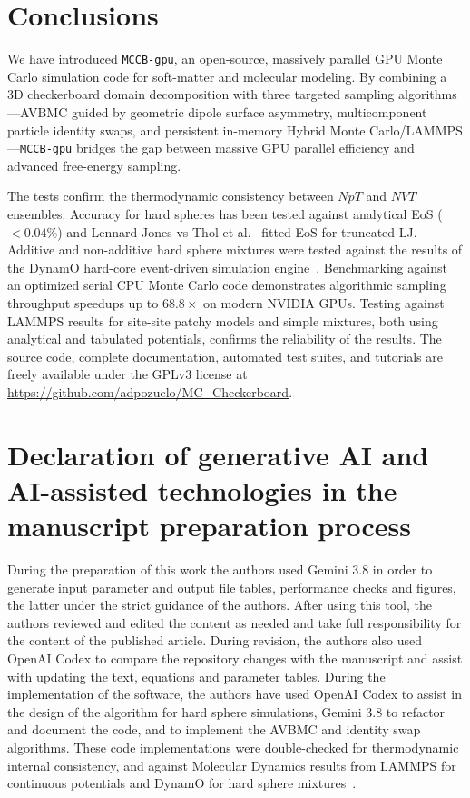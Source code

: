 \documentclass[final,5p,times,twocolumn]{elsarticle}
\begin{document}
\section{Conclusions}
\label{sec:conclusions}

We have introduced \texttt{MCCB-gpu}, an open-source, massively
parallel GPU Monte Carlo simulation code for soft-matter and molecular
modeling. By combining a 3D checkerboard domain decomposition with
three targeted sampling algorithms—AVBMC guided by geometric dipole
surface asymmetry, multicomponent particle identity swaps, and
persistent in-memory Hybrid Monte Carlo/LAMMPS—\texttt{MCCB-gpu}
bridges the gap between massive GPU parallel efficiency and advanced
free-energy sampling.  

The tests confirm the thermodynamic consistency between
$NpT$ and $NVT$ ensembles. Accuracy for hard spheres has been tested
against analytical EoS ($< 0.04\%$) and Lennard-Jones vs Thol et
al.~\cite{Thol2014} fitted EoS for truncated LJ. Additive and non-additive hard
sphere mixtures were tested against the results of the DynamO
hard-core event-driven simulation engine~\cite{bannerman2011dynamo}. 
Benchmarking against an optimized serial CPU
Monte Carlo code demonstrates algorithmic sampling throughput speedups
up to $\mathbf{68.8\times}$ on modern NVIDIA GPUs. Testing against
LAMMPS results for site-site patchy models and simple mixtures, both
using analytical and tabulated potentials, confirms the reliability of
the results. The source code,
complete documentation, automated test suites, and tutorials are
freely available under the GPLv3 license at
\url{https://github.com/adpozuelo/MC_Checkerboard}. 

\section{Declaration of generative AI and AI-assisted technologies in
  the manuscript preparation process} 

During the preparation of this work the authors used Gemini 3.8 in
order to generate input parameter and output file tables, performance
checks and figures, the latter under the strict guidance of the
authors. After using this tool, the authors 
reviewed and edited the content as needed and take full
responsibility for the content of the published article. During
revision, the authors also used OpenAI Codex to compare the repository
changes with the manuscript and assist with updating the text,
equations and parameter tables. During the implementation of the
software, the authors have used OpenAI Codex to assist in the design
of the algorithm for hard sphere simulations, Gemini 3.8 to refactor
and document the code, and to implement the AVBMC and identity swap
algorithms. These code implementations were double-checked for
thermodynamic internal consistency, and against Molecular Dynamics
results from LAMMPS for continuous potentials and DynamO for hard
sphere mixtures~\cite{bannerman2011dynamo}.
\end{document}
